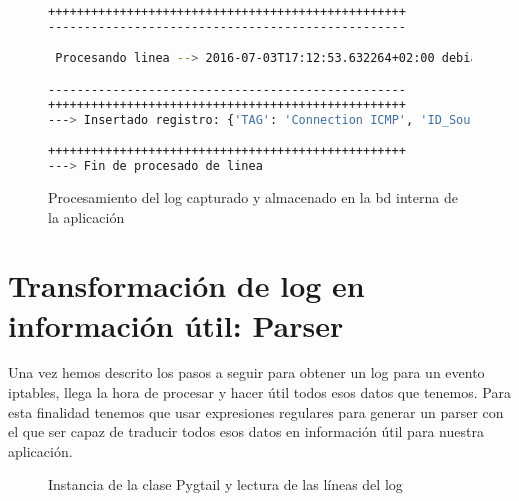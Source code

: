 \begin{figure}[H]
\begin{lstlisting}[language=bash, breaklines=true]
++++++++++++++++++++++++++++++++++++++++++++++++++
--------------------------------------------------

 Procesando linea --> 2016-07-03T17:12:53.632264+02:00 debian kernel: [23896.003739] IPTMSG=Connection ICMP IN=lo OUT= MAC=00:00:00:00:00:00:00:00:00:00:00:00:08:00 SRC=127.0.0.1 DST=127.0.0.1 LEN=84 TOS=0x00 PREC=0x00 TTL=64 ID=64157 DF PROTO=ICMP TYPE=8 CODE=0 ID=14177 SEQ=7

--------------------------------------------------
++++++++++++++++++++++++++++++++++++++++++++++++++
---> Insertado registro: {'TAG': 'Connection ICMP', 'ID_Source_PORT': None, 'Protocol': u'ICMP', 'RAW_Info': '2016-07-03T17:12:53.632264+02:00 debian kernel 23896.003739 IPTMSG=Connection ICMP IN=lo OUT MAC=00:00:00:00:00:00:00:00:00:00:00:00:08:00 SRC=127.0.0.1 DST=127.0.0.1 LEN=84 TOS=0x00 PREC=0x00 TTL=64 ID=64157 DF PROTO=ICMP TYPE=8 CODE=0 ID=14177 SEQ=7 ', 'ID_Source_MAC': <Macs: 00:00:00:00:00:00:00:00:00:00:00:00:08:00>, 'ID_Source_IP': <Ips: 127.0.0.1>, 'ID_Dest_IP': <Ips: 127.0.0.1>, 'ID_Dest_PORT': None, 'ID_Dest_MAC': <Macs: 00:00:00:00:00:00:00:00:00:00:00:00:08:00>}

++++++++++++++++++++++++++++++++++++++++++++++++++
---> Fin de procesado de linea
\end{lstlisting}
\caption{Procesamiento del log capturado y almacenado en la bd interna de la aplicación}
\end{figure}
\pagebreak

\section[Parser]{Transformación de log en información útil: Parser}

Una vez hemos descrito los pasos a seguir para obtener un log para un evento iptables, llega la hora de procesar y hacer útil todos esos datos que tenemos. Para esta finalidad tenemos que usar expresiones regulares para generar un parser con el que ser capaz de traducir todos esos datos en información útil para nuestra aplicación.\\

\begin{figure}[H]

\caption{Instancia de la clase Pygtail y lectura de las líneas del log}
\end{figure}

